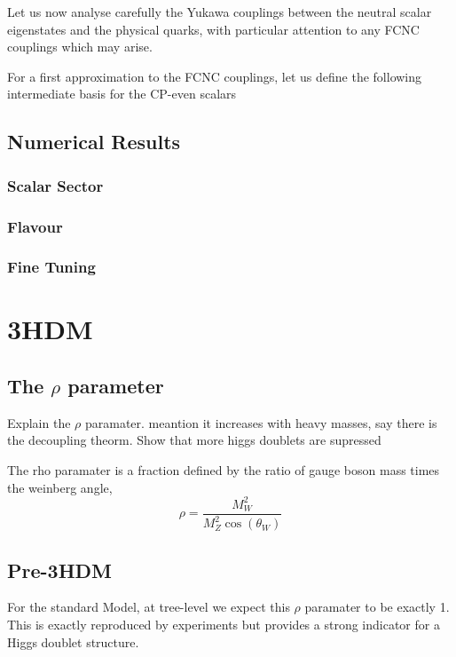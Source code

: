Let us now analyse carefully the Yukawa couplings between the neutral scalar
eigenstates and the physical quarks, with particular attention to any FCNC couplings which may arise.

For a first approximation to the FCNC couplings, let us define the following intermediate basis for the CP-even scalars


\section{Numerical Results}

\subsection{Scalar Sector}

\subsection{Flavour}

\subsection{Fine Tuning}


\chapter{3HDM}

\section{ The $\rho$ parameter }

{ \color{green} Explain the $\rho$ paramater. meantion it increases with heavy masses, say there is the decoupling theorm. Show that more higgs doublets are supressed  } 

The rho paramater is a fraction defined by the ratio of gauge boson mass times the weinberg angle, 
\begin{equation}
\rho = \frac{M_W^2}{M^2_Z \cos(\theta_W)}
\end{equation}
\section{Pre-3HDM}
For the standard Model, at tree-level we expect this $\rho$ paramater to be exactly 1. This is exactly reproduced by experiments but provides a strong indicator for a Higgs doublet structure. 

